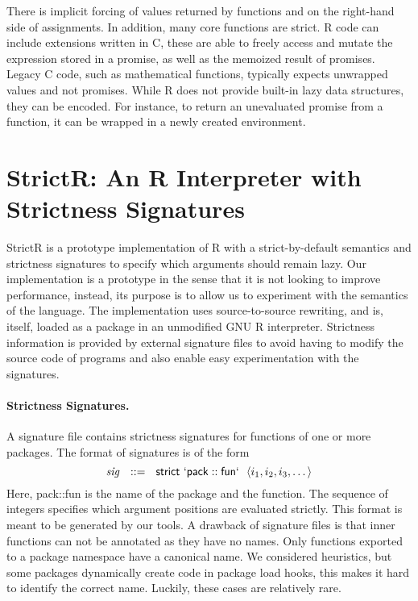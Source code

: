 \documentclass[review,screen,acmsmall]{acmart}
\newcommand{\strictr}{{\sf StrictR}\xspace}
\begin{document}
There is implicit forcing of values returned by functions and on the
right-hand side of assignments. In addition, many core functions are strict. R
code can include extensions written in C, these are able to freely access and
mutate the expression stored in a promise, as well as the memoized result of
promises. Legacy C code, such as mathematical functions, typically expects
unwrapped values and not promises. While R does not provide built-in lazy data
structures, they can be encoded. For instance, to return an
unevaluated promise from a function, it can be wrapped in a newly created
environment.

\section{StrictR: An R Interpreter with Strictness Signatures}\label{sec:strictr}

\strictr is a prototype implementation of R with a strict-by-default semantics
and strictness signatures to specify which arguments should remain lazy. Our
implementation is a prototype in the sense that it is not looking to improve
performance, instead, its purpose is to allow us to experiment with the
semantics of the language. The implementation uses source-to-source rewriting,
and is, itself, loaded as a package in an unmodified GNU R interpreter.
Strictness information is provided by external signature files to avoid having
to modify the source code of programs and also enable easy experimentation with
the signatures.

\paragraph{Strictness Signatures.}
A signature file contains strictness signatures for functions of one or more
packages. The format of signatures is of the form
%
\[
\mathit{sig}~~::=~~\mathsf{strict}~\mathsf{`pack}::\mathsf{fun`}~~\langle i_1,
i_2, i_3, \dots\rangle
\]
%
Here, {\sf pack::fun} is the name of the package and the function. The sequence
of integers specifies which argument positions are evaluated strictly. This
format is meant to be generated by our tools. A drawback of signature files is
that inner functions can not be annotated as they have no names. Only functions
exported to a package namespace have a canonical name. We considered heuristics,
but some packages dynamically create code in package load hooks, this makes it
hard to identify the correct name. Luckily, these cases are relatively rare.
\end{document}
